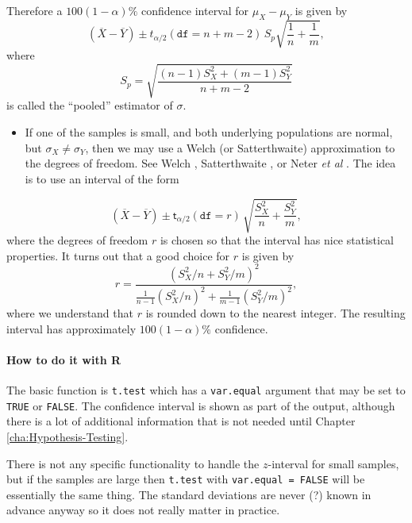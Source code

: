 \documentclass[captions=tableheading]{scrbook}
\begin{document}
Therefore a \(100(1-\alpha)\%\) confidence interval for \(\mu_{X}-\mu_{Y}\) is given by
\begin{equation}
\left(\overline{X}-\overline{Y}\right)\pm t_{\alpha/2}(\mathtt{df}=n+m-2)\, S_{p}\sqrt{\frac{1}{n}+\frac{1}{m}},
\end{equation}
where
\begin{equation}
S_{p}=\sqrt{\frac{(n-1)S_{X}^{2}+(m-1)S_{Y}^{2}}{n+m-2}}
\end{equation}
is called the ``pooled'' estimator of \(\sigma\).
\begin{itemize}
\item If one of the samples is small, and both underlying populations are normal, but \(\sigma_{X}\neq\sigma_{Y}\), then we may use a Welch (or Satterthwaite) approximation to the degrees of freedom. See Welch \cite{Welch1947}, Satterthwaite \cite{Satterthwaite1946}, or Neter \emph{et al} \cite{Neter1996}. The idea is to use an interval of the form
\end{itemize}
\begin{equation}
\left(\overline{X}-\overline{Y}\right)\pm\mathsf{t}_{\alpha/2}(\mathtt{df}=r)\,\sqrt{\frac{S_{X}^{2}}{n}+\frac{S_{Y}^{2}}{m}},
\end{equation}
where the degrees of freedom \(r\) is chosen so that the interval has nice statistical properties. It turns out that a good choice for \(r\) is given by
\begin{equation}
r=\frac{\left(S_{X}^{2}/n+S_{Y}^{2}/m\right)^{2}}{\frac{1}{n-1}\left(S_{X}^{2}/n\right)^{2}+\frac{1}{m-1}\left(S_{Y}^{2}/m\right)^{2}},
\end{equation}
where we understand that \(r\) is rounded down to the nearest integer. The resulting interval has approximately \(100(1-\alpha)\%\) confidence.

\paragraph*{How to do it with \textsf{R}}

The basic function is \texttt{t.test} which has a \texttt{var.equal} argument that may be set to \texttt{TRUE} or \texttt{FALSE}. The confidence interval is shown as part of the output, although there is a lot of additional information that is not needed until Chapter
\ref{cha:Hypothesis-Testing}.

There is not any specific functionality to handle the \(z\)-interval for small samples, but if the samples are large then \texttt{t.test} with \texttt{var.equal = FALSE} will be essentially the same thing. The standard deviations are never (?) known in advance anyway so it does not really matter in practice. 
\end{document}
